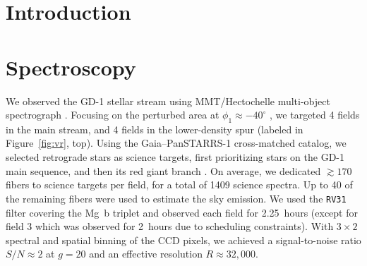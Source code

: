 \documentclass[twocolumn]{aastex63}
\newcommand{\kms}{\ensuremath{\textrm{km}\,\textrm{s}^{-1}}}
\begin{document}

\section{Introduction}
\label{sec:intro}



\section{Spectroscopy}
\label{sec:spec}


We observed the GD-1 stellar stream using MMT/Hectochelle multi-object spectrograph \citep{szentgyorgyi2011}.
Focusing on the perturbed area at $\phi_1\approx-40^\circ$ \citep[$\phi_{1,2}$ are coordinates oriented along and perpendicular to GD-1, respectively;][]{koposov2010}, we targeted 4 fields in the main stream, and 4 fields in the lower-density spur (labeled in Figure~\ref{fig:vr}, top).
Using the Gaia--PanSTARRS-1 cross-matched catalog, we selected retrograde stars as science targets, first prioritizing stars on the GD-1 main sequence, and then its red giant branch \citep[see][]{pwb}.
On average, we dedicated $\gtrsim170$ fibers to science targets per field, for a total of 1409 science spectra.
Up to 40 of the remaining fibers were used to estimate the sky emission.
We used the \texttt{RV31} filter covering the Mg~b triplet and observed each field for 2.25~hours (except for field 3 which was observed for 2~hours due to scheduling constraints).
With $3\times2$ spectral and spatial binning of the CCD pixels, we achieved a signal-to-noise ratio $S/N\approx2$ at $g=20$ and an effective resolution $R\approx32,000$.
\end{document}
